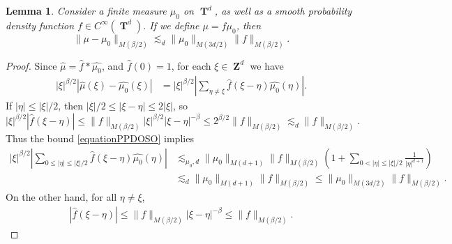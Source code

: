 \documentclass[12pt,reqno]{article}
\numberwithin{equation}{section}
\DeclareMathOperator{\ZZ}{\mathbf{Z}}
\DeclareMathOperator{\TT}{\mathbf{T}}
\newtheorem{lemma}[theorem]{Lemma}
\numberwithin{theorem}{section}
\begin{document}
\begin{lemma} \label{LemmaTTSICICS}
    Consider a finite measure $\mu_0$ on $\TT^d$, as well as a smooth probability density function $f \in C^\infty(\TT^d)$. If we define $\mu = f \mu_0$, then
    \[ \| \mu - \mu_0 \|_{M(\beta/2)} \lesssim_d \| \mu_0 \|_{M(3d/2)} \| f \|_{M(\beta/2)}. \]
\end{lemma}
\begin{proof}
    Since $\widehat{\mu} = \widehat{f} * \widehat{\mu_0}$, and $\widehat{f}(0) = 1$, for each $\xi \in \ZZ^d$ we have
    \begin{equation} \label{equationPPYTUECUUCS}
    \begin{split}
        |\xi|^{\beta/2} |\widehat{\mu}(\xi) - \widehat{\mu_0}(\xi)| &= |\xi|^{\beta/2} \left| \sum_{\eta \neq \xi} \widehat{f}(\xi - \eta) \widehat{\mu_0}(\eta) \right|.
    \end{split}
    \end{equation}
    If $|\eta| \leq |\xi|/2$, then $|\xi|/2 \leq |\xi - \eta| \leq 2 |\xi|$, so
    \begin{equation} \label{equationPPDOSO}
        |\xi|^{\beta/2} |\widehat{f}(\xi - \eta)| \leq \| f \|_{M(\beta/2)} |\xi|^{\beta/2} |\xi-\eta|^{-\beta} \leq 2^{\beta/2} \| f \|_{M(\beta/2)} \lesssim_d \| f \|_{M(\beta/2)}.
    \end{equation}
    Thus the bound \eqref{equationPPDOSO} implies
    \begin{equation} \label{equationGGPSOVVCSI}
    \begin{split}
        |\xi|^{\beta/2} \left| \sum_{0 \leq |\eta| \leq |\xi|/2} \widehat{f}(\xi - \eta) \widehat{\mu_0}(\eta) \right| &\lesssim_{\mu_0,d} \| \mu_0 \|_{M(d+1)} \| f \|_{M(\beta/2)} \left( 1 + \sum_{0 < |\eta| \leq |\xi|/2} \frac{1}{|\eta|^{d+1}} \right)\\
        &\lesssim_d \| \mu_0 \|_{M(d+1)} \| f \|_{M(\beta/2)} \leq \| \mu_0 \|_{M(3d/2)} \| f \|_{M(\beta/2)}.
    \end{split}
    \end{equation}
    On the other hand, for all $\eta \neq \xi$,
    \begin{equation} \label{equationGGDPSOX}
    \begin{split}
        |\widehat{f}(\xi - \eta)| \leq  \| f \|_{M(\beta/2)} |\xi - \eta|^{-\beta} \leq \| f \|_{M(\beta/2)}.

\end{split}
\end{equation}
\end{proof}
\end{document}
